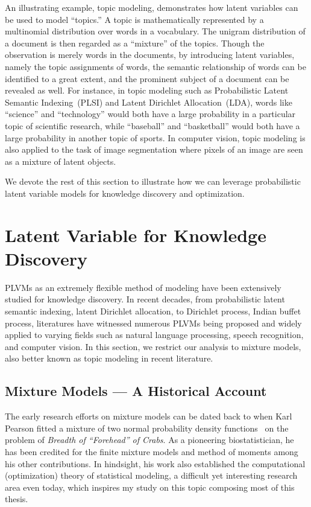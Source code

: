 An illustrating example, topic modeling, demonstrates how latent variables can
be used to model ``topics.'' A topic is mathematically represented by a
multinomial distribution over words in a vocabulary. The unigram distribution of
a document is then regarded as a ``mixture'' of the topics. Though the
observation is merely words in the documents, by introducing latent variables,
namely the topic assignments of words, the semantic relationship of words can be
identified to a great extent, and the prominent subject of a document can be
revealed as well. For instance, in topic modeling such as Probabilistic Latent
Semantic Indexing~(PLSI) and Latent Dirichlet Allocation~(LDA), words like
``science'' and ``technology'' would both have a large probability in a
particular topic of scientific research, while ``baseball'' and ``basketball''
would both have a large probability in another topic of sports. In computer
vision, topic modeling is also applied to the task of image segmentation where
pixels of an image are seen as a mixture of latent objects.

We devote the rest of this section to illustrate how we can leverage
probabilistic latent variable models for knowledge discovery and optimization.

\section{Latent Variable for Knowledge Discovery}

PLVMs as an extremely flexible method of modeling have been extensively studied
for knowledge discovery. In recent decades, from probabilistic latent semantic
indexing, latent Dirichlet allocation, to Dirichlet process, Indian buffet
process, literatures have witnessed numerous PLVMs being proposed and widely
applied to varying fields such as natural language processing, speech
recognition, and computer vision. In this section, we restrict our analysis to
mixture models, also better known as topic modeling in recent literature.

\subsection{Mixture Models --- A Historical Account}

The early research efforts on mixture models can be dated back to
\citeyear{pearson1896mathematical} when Karl Pearson fitted a mixture of two
normal probability density functions~\cite{pearson1896mathematical} on the
problem of \emph{Breadth of ``Forehead'' of Crabs}. As a pioneering
biostatistician, he has been credited for the finite mixture models and method
of moments among his other contributions. In hindsight, his work also
established the computational (optimization) theory of statistical modeling, a
difficult yet interesting research area even today, which inspires my study on
this topic composing most of this thesis.

